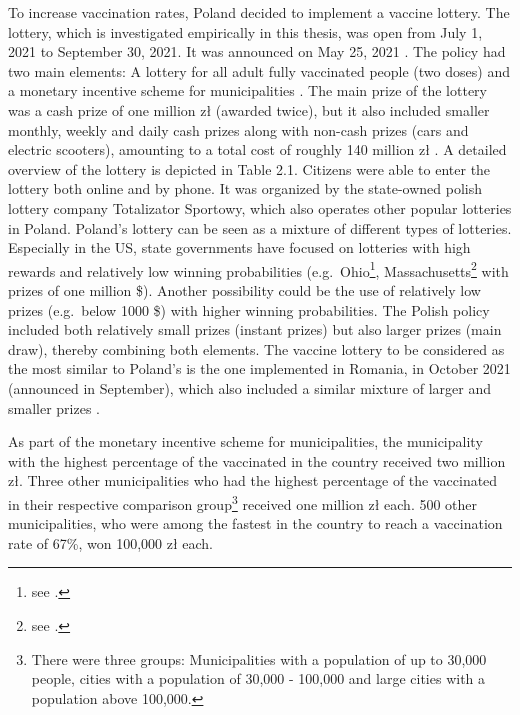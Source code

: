 \documentclass{scrbook}
\begin{document}
\renewcommand*{\arraystretch}{1}

To increase vaccination rates, Poland decided to implement a vaccine
lottery. The lottery, which is investigated empirically in this thesis,
was open from July 1, 2021 to September 30, 2021. It was announced on
May 25, 2021 \parencite{charlish_poland_2021}. The policy had two main
elements: A lottery for all adult fully vaccinated people (two doses)
\parencite{service_of_the_republic_of_poland_national_2021} and a
monetary incentive scheme for municipalities
\parencite{service_of_the_republic_of_poland_competitions_2021}. The
main prize of the lottery was a cash prize of one million zł (awarded
twice), but it also included smaller monthly, weekly and daily cash
prizes along with non-cash prizes (cars and electric scooters),
amounting to a total cost of roughly 140 million zł
\parencite{wilczek_poland_2021}. A detailed overview of the lottery is
depicted in Table 2.1. Citizens were able to enter the lottery both
online and by phone. It was organized by the state-owned polish lottery
company Totalizator Sportowy, which also operates other popular
lotteries in Poland. Poland's lottery can be seen as a mixture of
different types of lotteries. Especially in the US, state governments
have focused on lotteries with high rewards and relatively low winning
probabilities
(e.g.~Ohio\footnote{see \textcite{ohio_department_of_health_ohio_2021}.},
Massachusetts\footnote{see \textcite{commonwealth_of_massachusetts_massachusetts_2021}.}
with prizes of one million \$). Another possibility could be the use of
relatively low prizes (e.g.~below 1000 \$) with higher winning
probabilities. The Polish policy included both relatively small prizes
(instant prizes) but also larger prizes (main draw), thereby combining
both elements. The vaccine lottery to be considered as the most similar
to Poland's is the one implemented in Romania, in October 2021
(announced in September), which also included a similar mixture of
larger and smaller prizes
\parencite{health_ministry_of_romania_press_2021}.

As part of the monetary incentive scheme for municipalities, the
municipality with the highest percentage of the vaccinated in the
country received two million zł. Three other municipalities who had the
highest percentage of the vaccinated in their respective comparison
group\footnote{There were three groups: Municipalities with a population of up to 30,000 people, cities with a population of 30,000 - 100,000 and large cities with a population above 100,000.}
received one million zł each. 500 other municipalities, who were among
the fastest in the country to reach a vaccination rate of 67\%, won
100,000 zł each.
\end{document}

